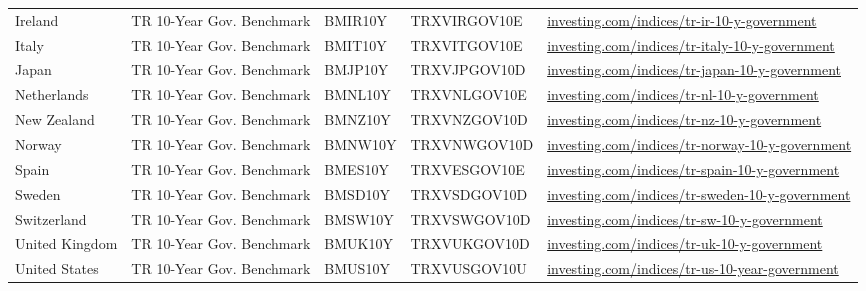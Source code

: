 {\begin{longtable}{l l l l l}
\hspace{1em}Ireland & TR 10-Year Gov. Benchmark & BMIR10Y & TRXVIRGOV10E & \href{https://www.investing.com/indices/tr-ir-10-y-government}{investing.com/indices/tr-ir-10-y-government} \\
\hspace{1em}Italy & TR 10-Year Gov. Benchmark & BMIT10Y & TRXVITGOV10E & \href{https://www.investing.com/indices/tr-italy-10-y-government}{investing.com/indices/tr-italy-10-y-government} \\
\hspace{1em}Japan & TR 10-Year Gov. Benchmark & BMJP10Y & TRXVJPGOV10D & \href{https://www.investing.com/indices/tr-japan-10-y-government}{investing.com/indices/tr-japan-10-y-government} \\
\hspace{1em}Netherlands & TR 10-Year Gov. Benchmark & BMNL10Y & TRXVNLGOV10E & \href{https://www.investing.com/indices/tr-nl-10-y-government}{investing.com/indices/tr-nl-10-y-government} \\
\hspace{1em}New Zealand & TR 10-Year Gov. Benchmark & BMNZ10Y & TRXVNZGOV10D & \href{https://www.investing.com/indices/tr-nz-10-y-government}{investing.com/indices/tr-nz-10-y-government} \\
\hspace{1em}Norway & TR 10-Year Gov. Benchmark & BMNW10Y & TRXVNWGOV10D & \href{https://www.investing.com/indices/tr-norway-10-y-government}{investing.com/indices/tr-norway-10-y-government} \\
\hspace{1em}Spain & TR 10-Year Gov. Benchmark & BMES10Y & TRXVESGOV10E & \href{https://www.investing.com/indices/tr-spain-10-y-government}{investing.com/indices/tr-spain-10-y-government} \\
\hspace{1em}Sweden & TR 10-Year Gov. Benchmark & BMSD10Y & TRXVSDGOV10D & \href{https://www.investing.com/indices/tr-sweden-10-y-government}{investing.com/indices/tr-sweden-10-y-government} \\
\hspace{1em}Switzerland & TR 10-Year Gov. Benchmark & BMSW10Y & TRXVSWGOV10D & \href{https://www.investing.com/indices/tr-sw-10-y-government}{investing.com/indices/tr-sw-10-y-government} \\
\hspace{1em}United Kingdom & TR 10-Year Gov. Benchmark & BMUK10Y & TRXVUKGOV10D & \href{https://www.investing.com/indices/tr-uk-10-y-government}{investing.com/indices/tr-uk-10-y-government} \\
\hspace{1em}United States & TR 10-Year Gov. Benchmark & BMUS10Y & TRXVUSGOV10U & \href{https://www.investing.com/indices/tr-us-10-year-government}{investing.com/indices/tr-us-10-year-government} \\
\end{longtable}
}

